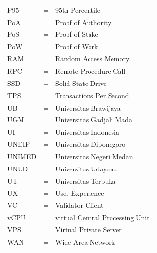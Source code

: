 \begin{longtable}[l]{llp{3in}}
	P95 & \hspace{1.5cm} = & 95th Percentile \\
	PoA & \hspace{1.5cm} = & Proof of Authority \\
	PoS & \hspace{1.5cm} = & Proof of Stake \\
	PoW & \hspace{1.5cm} = & Proof of Work \\
	RAM & \hspace{1.5cm} = & Random Access Memory \\
	RPC & \hspace{1.5cm} = & Remote Procedure Call \\
	SSD & \hspace{1.5cm} = & Solid State Drive \\
	TPS & \hspace{1.5cm} = & Transactions Per Second \\
	UB & \hspace{1.5cm} = & Universitas Brawijaya \\
	UGM & \hspace{1.5cm} = & Universitas Gadjah Mada \\
	UI & \hspace{1.5cm} = & Universitas Indonesia \\
	UNDIP & \hspace{1.5cm} = & Universitas Diponegoro \\
	UNIMED & \hspace{1.5cm} = & Universitas Negeri Medan \\
	UNUD & \hspace{1.5cm} = & Universitas Udayana \\
	UT & \hspace{1.5cm} = & Universitas Terbuka \\
	UX & \hspace{1.5cm} = & User Experience \\
	VC & \hspace{1.5cm} = & Validator Client \\
	vCPU & \hspace{1.5cm} = & virtual Central Processing Unit \\
	VPS & \hspace{1.5cm} = & Virtual Private Server \\
	WAN & \hspace{1.5cm} = & Wide Area Network \\
\end{longtable}
